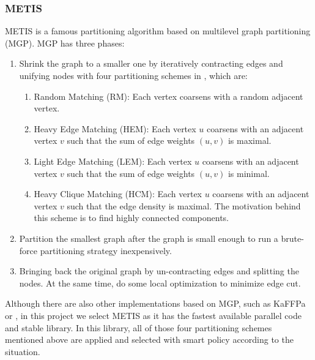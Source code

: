 \subsubsection{METIS}
METIS\cite{Karypis95metis} is a famous partitioning algorithm based on multilevel graph partitioning (MGP). MGP has three phases:
\begin{enumerate}
\item Shrink the graph to a smaller one by iteratively contracting edges and unifying nodes with four partitioning schemes in \cite{karypis1995multilevel}, which are:
    \begin{enumerate}
        \item Random Matching (RM): Each vertex coarsens with a random adjacent vertex.
        \item Heavy Edge Matching (HEM): Each vertex $u$ coarsens with an adjacent vertex $v$ such that the sum of edge weights $(u,v)$ is maximal.
        \item Light Edge Matching (LEM): Each vertex $u$ coarsens with an adjacent vertex $v$ such that the sum of edge weights $(u,v)$ is minimal.
        \item Heavy Clique Matching (HCM): Each vertex $u$ coarsens with an adjacent vertex $v$ such that the edge density is maximal. The motivation behind this scheme is to find highly connected components.
    \end{enumerate}
\item Partition the smallest graph after the graph is small enough to run a brute-force partitioning strategy inexpensively.
\item Bringing back the original graph by un-contracting edges and splitting the nodes. At the same time, do some local optimization to minimize edge cut.
\end{enumerate}
Although there are also other implementations based on MGP, such as KaFFPa\cite{sanders2011engineering} or \cite{soper2004combined}, in this project we select METIS as it has the fastest available parallel code and stable library. In this library, all of those four partitioning schemes mentioned above are applied and selected with smart policy according to the situation.
